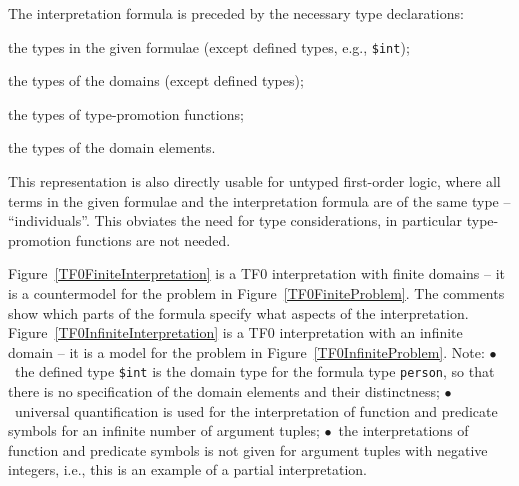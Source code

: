 \documentclass[letterpaper]{article}
\newcommand{\smalltt}[1]{\small \texttt{#1}}
\newenvironment{packed_itemize}{
\vspace*{-0.2em}
\begin{itemize}
\setlength{\partopsep}{0pt}
\setlength{\itemsep}{1pt}
\setlength{\parskip}{0pt}
\setlength{\parsep}{0pt}
}{\end{itemize}}
\begin{document}
The interpretation formula is preceded by the necessary type declarations:
\begin{packed_itemize}
\item the types in the given formulae (except defined types, e.g., {\smalltt{\$int}});
\item the types of the domains (except defined types);
\item the types of type-promotion functions;
\item the types of the domain elements.
\end{packed_itemize}
This representation is also directly usable for untyped first-order logic, where all terms in 
the given formulae and the interpretation formula are of the same type – ``individuals''. 
This obviates the need for type considerations, in particular type-promotion functions are not 
needed.

Figure~\ref{TF0FiniteInterpretation} is a TF0 interpretation with finite domains -- it is a 
countermodel for the problem in Figure~\ref{TF0FiniteProblem}.
The comments show which parts of the formula specify what aspects of the interpretation.
Figure~\ref{TF0InfiniteInterpretation} is a TF0 interpretation with an infinite domain -- it 
is a model for the problem in Figure~\ref{TF0InfiniteProblem}.
Note:
$\bullet$~the defined type {\smalltt{\$int}} is the domain type for the formula type 
{\smalltt{person}}, so that there is no specification of the domain elements and their 
distinctness;
$\bullet$~universal quantification is used for the interpretation of function and predicate
symbols for an infinite number of argument tuples;
$\bullet$~the interpretations of function and predicate symbols is not given for argument 
tuples with negative integers, i.e., this is an example of a partial interpretation.
\end{document}
